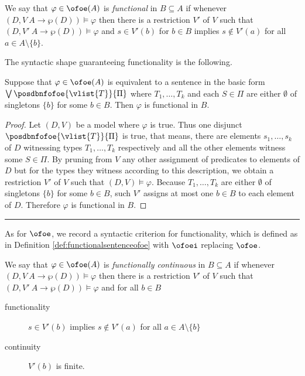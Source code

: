 \begin{definition}\label{def:functionalsentenceofoe}
We say that $\varphi \in \ofoe(A)$ is \emph{functional} in
$B\subseteq A$ if 
whenever $(D,V \: A \to \wp(D)) \models \varphi$ then there is a
restriction 
$V'$ of $V$ such that $(D,V' \: A \to \wp(D)) \models \varphi$ and $s
\in V'(b)$
for $b \in B$ implies $s \not\in V'(a)$ for all $a \in
A\setminus\{b\}$.
\end{definition}

The syntactic shape guaranteeing functionality is the following.
\begin{proposition}\label{lemma:functionalsentenceofoe} 
Suppose that $\varphi \in \ofoe(A)$ is equivalent to a sentence in
the basic form
$\bigvee \posdbnfofoe{\vlist{T}}{\Pi}$ where $T_1, \dots, T_k$ and
each $S \in 
\Pi$ are either $\emptyset$ of singletons $\{b\}$ for some $b \in B$. 
\todo %
Then $\varphi$ is functional in $B$.
\end{proposition}

\begin{proof} 
Let $(D,V)$ be a model where $\varphi$ is true. Thus one disjunct
$\posdbnfofoe{\vlist{T}}{\Pi}$ is true, that means, there are
elements $s_1, \dots, s_k$ of $D$ witnessing types $T_1, \dots, T_k$
respectively and all the other elements witness some $S \in \Pi$. By
pruning from $V$ any other assignment of predicates to elements of
$D$ but for the types they witness according to this description, we
obtain a restriction $V'$ of $V$ such that $(D,V) \models \varphi$.
Because $T_1, \dots, T_k$ are either $\emptyset$ of singletons
$\{b\}$ for some $b \in B$, such $V'$ assigns at most one $b \in B$
to each element of $D$. Therefore $\varphi$ is functional in $B$.
\end{proof}
\bigskip\hrule\bigskip

As for $\ofoe$, we record a syntactic criterion for functionality,
which is
defined as in Definition \ref{def:functionalsentenceofoe} with
$\ofoei$ 
replacing $\ofoe$. 

\begin{definition}We say that $\varphi \in \ofoe(A)$ is
\emph{functionally continuous} in $B\subseteq A$ if whenever $(D,V \:
A \to \wp(D)) \models \varphi$ then there is a restriction $V'$ of
$V$ such that $(D,V' \: A \to \wp(D)) \models \varphi$ and for all $b
\in B$
\begin{description}
\item[functionality] $s \in V'(b)$ implies $s \not\in V'(a)$ for all
$a \in A\setminus\{b\}$
\item[continuity] $V'(b)$ is finite.
\end{description}
\end{definition}

